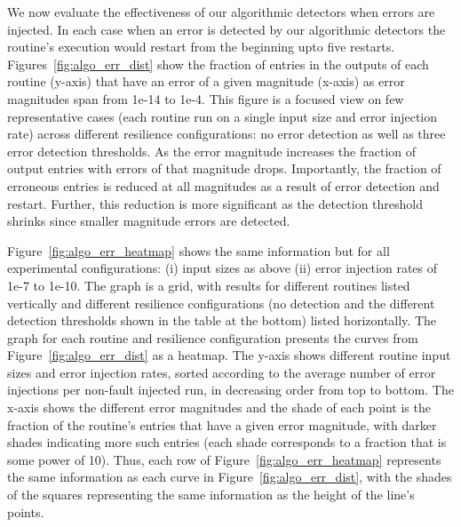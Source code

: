 \documentclass{sig-alternate}
\begin{document}
{We now evaluate the effectiveness of our algorithmic detectors when errors are injected.
In each case when an error is detected by our algorithmic detectors the routine's execution would restart from the beginning upto five restarts.
Figures~\ref{fig:algo_err_dist} show the fraction of entries in the outputs of each routine (y-axis) that have an error of a given magnitude (x-axis) as error magnitudes span from 1e-14 to 1e-4.
This figure is a focused view on few representative cases (each routine run on a single input size and error injection rate) across different resilience configurations: no error detection as well as three error detection thresholds.
As the error magnitude increases the fraction of output entries with errors of that magnitude drops.
Importantly, the fraction of erroneous entries is reduced at all magnitudes as a result of error detection and restart.
Further, this reduction is more significant as the detection threshold shrinks since smaller magnitude errors are detected.

Figure~\ref{fig:algo_err_heatmap} shows the same information but for all experimental configurations: (i) input sizes as above (ii) error injection rates of 1e-7 to 1e-10.
The graph is a grid, with results for different routines listed vertically and different resilience configurations (no detection and the different detection thresholds shown in the table at the bottom) listed horizontally.
The graph for each routine and resilience configuration presents the curves from Figure~\ref{fig:algo_err_dist} as a heatmap.
The y-axis shows different routine input sizes and error injection rates, sorted according to the average number of error injections per non-fault injected run, in decreasing order from top to bottom.
The x-axis shows the different error magnitudes and the shade of each point is the fraction of the routine's entries that have a given error magnitude, with darker shades indicating more such entries (each shade corresponds to a fraction that is some power of 10).
Thus, each row of Figure~\ref{fig:algo_err_heatmap} represents the same information as each curve in Figure~\ref{fig:algo_err_dist}, with the shades of the squares representing the same information as the height of the line's points.

}
\end{document}

